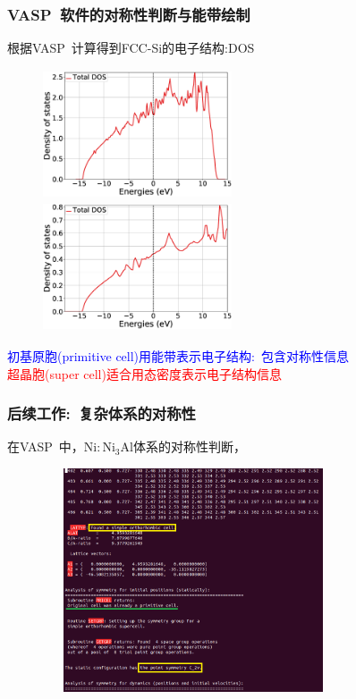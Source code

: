 \documentclass[cjk,slidestop,handout,compress,mathserif,blue]{beamer}	%
\begin{document}
\frame
{
	\frametitle{\textrm{VASP~}软件的对称性判断与能带绘制}
	根据\textrm{VASP~}计算得到\textrm{FCC-Si}的电子结构:\textrm{DOS}
\begin{figure}[h!]
\centering
\vspace*{-0.1in}
\hspace*{-0.20in}
\includegraphics[height=1.5in,width=2.2in,viewport=0 0 890 570,clip]{Figures/VASP_FCC_Si-DOS_4.eps}
\hspace*{0.01in}
\includegraphics[height=1.5in,width=2.2in,viewport=0 0 890 570,clip]{Figures/VASP_FCC_Si-DOS_1.eps}
\caption{\fontsize{7.2pt}{4.2pt}}%
\label{FCC_Si-DOS}
\end{figure} 
\vspace*{-0.2in}
		\textcolor{blue}{初基原胞(\textrm{primitive cell})用能带表示电子结构:~包含对称性信息}\\
\vspace*{0.1in}
		\textcolor{red}{超晶胞(\textrm{super cell})适合用态密度表示电子结构信息}
}

\frame
{
	\frametitle{后续工作:~复杂体系的对称性}
	在\textrm{VASP~}中，$\mathrm{Ni}:\mathrm{Ni}_3\mathrm{Al}$体系的对称性判断，
\begin{figure}[h!]
\centering
\includegraphics[height=2.6in,width=3.5in,viewport=0 0 680 530,clip]{Figures/VASP_Alloy_Ni-Al_symmetry.png}
\label{Alloy_Ni-Al-OUTCAR}
\end{figure} 
}
\end{document}
